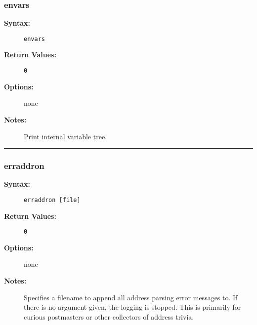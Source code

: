 \subsubsection{envars}

\begin{description}
\item[{\bf Syntax:}] \mbox{}

{\tt envars}

\item[{\bf Return Values:}] \mbox{}

\begin{description}
\item[{\tt 0}] \mbox{}



\end{description}


\item[{\bf Options:}] \mbox{}

none  

\item[{\bf Notes:}] \mbox{}

Print internal variable tree.

\end{description}


\hrule
\subsubsection{erraddron}

\begin{description}
\item[{\bf Syntax:}] \mbox{}

{\tt erraddron [file]}

\item[{\bf Return Values:}] \mbox{}

\begin{description}
\item[{\tt 0}] \mbox{}



\end{description}


\item[{\bf Options:}] \mbox{}

none  

\item[{\bf Notes:}] \mbox{}

Specifies a filename to append all address 
parsing error messages to. If there is no argument given, the 
logging is stopped. This is primarily for curious postmasters 
or other collectors of address trivia.

\end{description}


